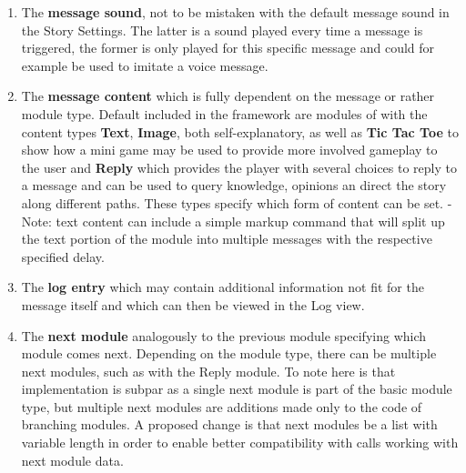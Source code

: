 \begin{enumerate}
\item The \textbf{message sound}, not to be mistaken with the default message sound in the Story Settings. The latter is a sound played every time a message is triggered, the former is only played for this specific message and could for example be used to imitate a voice message.
\item The \textbf{message content} which is fully dependent on the message or rather module type. Default included in the framework are modules of with the content types \textbf{Text}, \textbf{Image}, both self-explanatory, as well as \textbf{Tic Tac Toe} to show how a mini game may be used to provide more involved gameplay to the user and \textbf{Reply} which provides the player with several choices to reply to a message and can be used to query knowledge, opinions an direct the story along different paths. These types specify which form of content can be set. - Note: text content can include a simple markup command that will split up the text portion of the module into multiple messages with the respective specified delay. 
\item The \textbf{log entry} which may contain additional information not fit for the message itself and which can then be viewed in the Log view.
\item The \textbf{next module} analogously to the previous module specifying which module comes next. Depending on the module type, there can be multiple next modules, such as with the Reply module. To note here is that implementation is subpar as a single next module is part of the basic module type, but multiple next modules are additions made only to the code of branching modules. A proposed change is that next modules be a list with variable length in order to enable better compatibility with calls working with next module data.
\end{enumerate}

